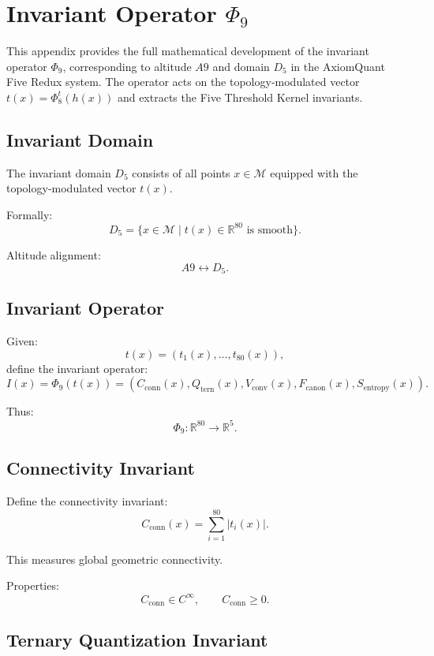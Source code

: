 \section{Invariant Operator \texorpdfstring{$\Phi_9$}{Phi9}}
\label{sec:invariants}

This appendix provides the full mathematical development of the invariant
operator $\Phi_9$, corresponding to altitude $A9$ and domain $D_5$ in the
AxiomQuant Five Redux system. The operator acts on the topology-modulated
vector $t(x) = \Phi_8^t(h(x))$ and extracts the Five Threshold Kernel
invariants.

\subsection{Invariant Domain}

The invariant domain $D_5$ consists of all points $x \in \mathcal{M}$ equipped
with the topology-modulated vector $t(x)$.

Formally:
\[
D_5 = \{ x \in \mathcal{M} \mid t(x) \in \mathbb{R}^{80} \text{ is smooth} \}.
\]

Altitude alignment:
\[
A9 \leftrightarrow D_5.
\]

\subsection{Invariant Operator}

Given:
\[
t(x) = (t_1(x), \dots, t_{80}(x)),
\]
define the invariant operator:
\[
I(x) = \Phi_9(t(x))
= \left(
C_{\text{conn}}(x),
Q_{\text{tern}}(x),
V_{\text{conv}}(x),
F_{\text{canon}}(x),
S_{\text{entropy}}(x)
\right).
\]

Thus:
\[
\Phi_9 : \mathbb{R}^{80} \to \mathbb{R}^5.
\]

\subsection{Connectivity Invariant}

Define the connectivity invariant:
\[
C_{\text{conn}}(x)
= \sum_{i=1}^{80} |t_i(x)|.
\]

This measures global geometric connectivity.

Properties:
\[
C_{\text{conn}} \in C^\infty,
\qquad
C_{\text{conn}} \ge 0.
\]

\subsection{Ternary Quantization Invariant}


